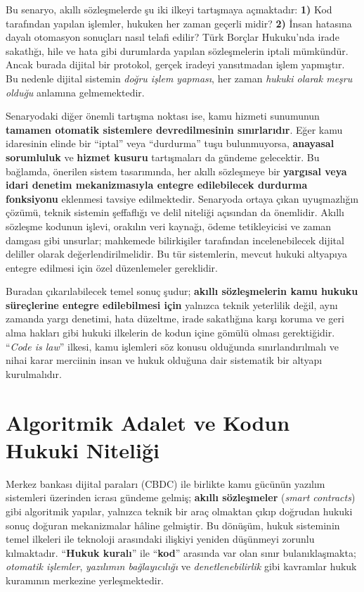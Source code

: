 \documentclass[a4paper,12pt]{article}
\begin{document}
Bu senaryo, akıllı sözleşmelerde şu iki ilkeyi tartışmaya açmaktadır: \textbf{1)} Kod tarafından yapılan işlemler, hukuken her zaman geçerli midir? \textbf{2)} İnsan hatasına dayalı otomasyon sonuçları nasıl telafi edilir? Türk Borçlar Hukuku’nda irade sakatlığı, hile ve hata gibi durumlarda yapılan sözleşmelerin iptali mümkündür. Ancak burada dijital bir protokol, gerçek iradeyi yansıtmadan işlem yapmıştır. Bu nedenle dijital sistemin \textit{doğru işlem yapması}, her zaman \textit{hukuki olarak meşru olduğu} anlamına gelmemektedir.

Senaryodaki diğer önemli tartışma noktası ise, kamu hizmeti sunumunun \textbf{tamamen otomatik sistemlere devredilmesinin sınırlarıdır}. Eğer kamu idaresinin elinde bir “iptal” veya “durdurma” tuşu bulunmuyorsa, \textbf{anayasal sorumluluk} ve \textbf{hizmet kusuru} tartışmaları da gündeme gelecektir. Bu bağlamda, önerilen sistem tasarımında, her akıllı sözleşmeye bir \textbf{yargısal veya idari denetim mekanizmasıyla entegre edilebilecek durdurma fonksiyonu} eklenmesi tavsiye edilmektedir. Senaryoda ortaya çıkan uyuşmazlığın çözümü, teknik sistemin şeffaflığı ve delil niteliği açısından da önemlidir. Akıllı sözleşme kodunun işlevi, orakılın veri kaynağı, ödeme tetikleyicisi ve zaman damgası gibi unsurlar; mahkemede bilirkişiler tarafından incelenebilecek dijital deliller olarak değerlendirilmelidir. Bu tür sistemlerin, mevcut hukuki altyapıya entegre edilmesi için özel düzenlemeler gereklidir.

Buradan çıkarılabilecek temel sonuç şudur; \textbf{akıllı sözleşmelerin kamu hukuku süreçlerine entegre edilebilmesi için} yalnızca teknik yeterlilik değil, aynı zamanda yargı denetimi, hata düzeltme, irade sakatlığına karşı koruma ve geri alma hakları gibi hukuki ilkelerin de kodun içine gömülü olması gerektiğidir. “\textit{Code is law}” ilkesi, kamu işlemleri söz konusu olduğunda sınırlandırılmalı ve nihai karar merciinin insan ve hukuk olduğuna dair sistematik bir altyapı kurulmalıdır.


\section{Algoritmik Adalet ve Kodun Hukuki Niteliği}

Merkez bankası dijital paraları (CBDC) ile birlikte kamu gücünün yazılım sistemleri üzerinden icrası gündeme gelmiş; \textbf{akıllı sözleşmeler} (\textit{smart contracts}) gibi algoritmik yapılar, yalnızca teknik bir araç olmaktan çıkıp doğrudan hukuki sonuç doğuran mekanizmalar hâline gelmiştir. Bu dönüşüm, hukuk sisteminin temel ilkeleri ile teknoloji arasındaki ilişkiyi yeniden düşünmeyi zorunlu kılmaktadır. “\textbf{Hukuk kuralı}” ile “\textbf{kod}” arasında var olan sınır bulanıklaşmakta; \textit{otomatik işlemler}, \textit{yazılımın bağlayıcılığı} ve \textit{denetlenebilirlik} gibi kavramlar hukuk kuramının merkezine yerleşmektedir.
\end{document}
